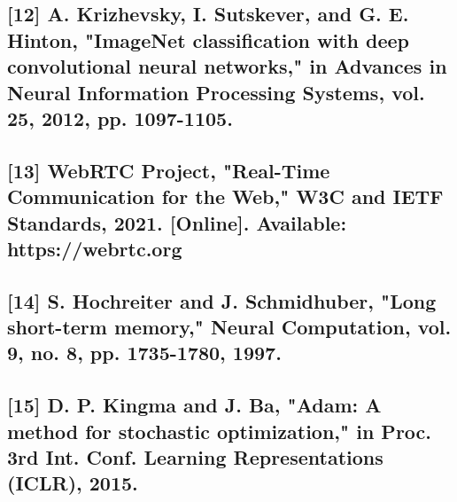 \documentclass[conference]{IEEEtran}
\begin{document}
\subsection{[12] A. Krizhevsky, I. Sutskever, and G. E. Hinton, "ImageNet classification with deep convolutional neural networks," in Advances in Neural Information Processing Systems, vol. 25, 2012, pp. 1097-1105.}
\subsection{[13] WebRTC Project, "Real-Time Communication for the Web," W3C and IETF Standards, 2021. [Online]. Available: https://webrtc.org}
\subsection{[14] S. Hochreiter and J. Schmidhuber, "Long short-term memory," Neural Computation, vol. 9, no. 8, pp. 1735-1780, 1997.}
\subsection{[15] D. P. Kingma and J. Ba, "Adam: A method for stochastic optimization," in Proc. 3rd Int. Conf. Learning Representations (ICLR), 2015.}
\end{document}
